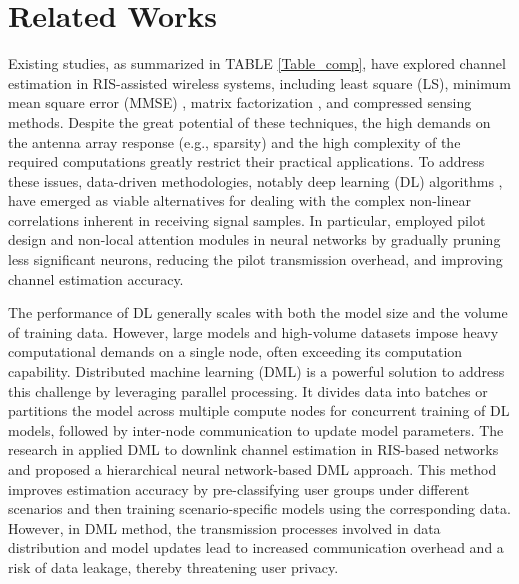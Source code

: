 \section{Related Works}
\label{relatedworks}
Existing studies, as summarized in TABLE \ref{Table_comp}, have explored channel estimation in RIS-assisted wireless systems, including least square (LS), minimum mean square error (MMSE) \cite{MMSE}, matrix factorization \cite{MF}, and compressed sensing \cite{CS} methods. Despite the great potential of these techniques, the high demands on the antenna array response (e.g., sparsity) and the high complexity of the required computations greatly restrict their practical applications. To address these issues, data-driven methodologies, notably deep learning (DL) algorithms \cite{DL_1}, have emerged as viable alternatives for dealing with the complex non-linear correlations inherent in receiving signal samples. In particular, \cite{DNN-1} employed pilot design and non-local attention modules in neural networks by gradually pruning less significant neurons, reducing the pilot transmission overhead, and improving channel estimation accuracy. 


The performance of DL  generally scales with both the model size and the volume of training data. However, large models and high-volume datasets impose heavy computational demands on a single node, often exceeding  its  computation capability.  Distributed machine learning (DML) is a powerful solution to address this challenge  by leveraging parallel processing\cite{DML1}. It divides data into batches or partitions the model across multiple compute nodes for concurrent training of DL models, followed by inter-node communication to update model parameters. 
The research in \cite{DML} applied DML to downlink channel estimation in RIS-based networks and proposed a hierarchical neural network-based DML approach. This method improves estimation accuracy by pre-classifying user groups under different scenarios and then training scenario-specific models using the corresponding data. However,  in DML method, the transmission processes involved in data distribution and model updates  lead to increased   communication overhead and   a risk of data leakage, thereby threatening user privacy. %

